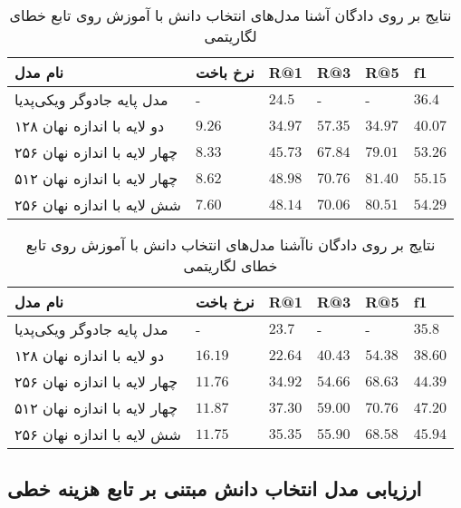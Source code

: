 \begin{table}[h]
	\caption{نتایج بر روی دادگان آشنا مدل‌های انتخاب دانش با آموزش روی تابع خطای لگاریتمی }
	\centering
	\label{table:knowledge:log:seen}
	\begin{tabular}{|l|l|l|l|l|l|}
		\hline
		نام مدل                      & نرخ باخت & R@1     & R@3     & R@5     & f1      \\ \hline
		مدل پایه جادوگر ویکی‌پدیا    & -        & $24.5$  & -       & -       & $36.4$  \\ \hline
		دو لایه با اندازه نهان ۱۲۸   & $9.26$   & $34.97$ & $57.35$ & $34.97$ & $40.07$ \\ \hline
		چهار لایه با اندازه نهان ۲۵۶ & $8.33$   & $45.73$ & $67.84$ & $79.01$ & $53.26$ \\ \hline
		چهار لایه با اندازه نهان ۵۱۲ & $8.62$   & $48.98$ & $70.76$ & $81.40$ & $55.15$ \\ \hline
		شش لایه با اندازه نهان ۲۵۶   & $7.60$   & $48.14$ & $70.06$ & $80.51$ & $54.29$ \\ \hline
	\end{tabular}
\end{table}

\begin{table}[h]
	\caption{نتایج بر روی دادگان ناآشنا مدل‌های انتخاب دانش با آموزش روی تابع خطای لگاریتمی }
	\centering
	\label{table:knowledge:log:unseen}
	\begin{tabular}{|l|l|l|l|l|l|}
		\hline
		نام مدل                      & نرخ باخت & R@1     & R@3     & R@5     & f1      \\ \hline
		مدل پایه جادوگر ویکی‌پدیا    & -        & $23.7$  & -       & -       & $35.8$  \\ \hline
		دو لایه با اندازه نهان ۱۲۸   & $16.19$  & $22.64$ & $40.43$ & $54.38$ & $38.60$ \\ \hline
		چهار لایه با اندازه نهان ۲۵۶ & $11.76$  & $34.92$ & $54.66$ & $68.63$ & $44.39$ \\ \hline
		چهار لایه با اندازه نهان ۵۱۲ & $11.87$  & $37.30$ & $59.00$ & $70.76$ & $47.20$ \\ \hline
		شش لایه با اندازه نهان ۲۵۶   & $11.75$  & $35.35$ & $55.90$ & $68.58$ & $45.94$ \\ \hline
	\end{tabular}
\end{table}


\subsection{ارزیابی مدل انتخاب دانش مبتنی بر تابع هزینه خطی}
\label{chap5:lin_eval}

